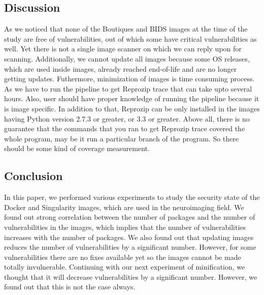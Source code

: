 \documentclass[a4paper,num-refs]{oup-contemporary}
\begin{document}
\subsection{Discussion}

As we noticed that none of the Boutiques and BIDS images at the time of the study are free of vulnerabilities, out of which
some have critical vulnerabilities as well. Yet there is not a single image scanner on which we can reply upon for
scanning. Additionally, we cannot update all images because some OS releases, which are used inside images, 
already reached end-of-life and are
no longer getting updates. Futhermore, minimization of images is time consuming process. As we have to run
the pipeline to get Reprozip trace that can take upto several hours. Also, user should have proper knowledge
of running the pipeline because it is image specific. In addition to that, Reprozip can be only installed
in the images having Python version 2.7.3 or greater, or 3.3 or greater. Above all, there is no guarantee that
the commands that you ran to get Reprozip trace covered the whole program, may be it run a particular
branch of the program. So there should be some kind of coverage measurement.

\subsection{Conclusion}

In this paper, we performed various experiments to study the security state of the Docker
and Singularity images, which are used in the neuroimaging field. We found out strong correlation
between the number of packages and the number of vulnerabilities in the images, which implies
that the number of vulnerabilities increases with the number of packages. We also found out that
updating images reduces the number of vulnerabilities by a significant number. However, for some
vulnerabilities there are no fixes available yet so the images cannot 
be made totally invulnerable. Continuing with our next experiment of minification, we thought that
it will decrease vulnerabilities by a significant number. However, we found out that this is not
the case always.


\end{document}
